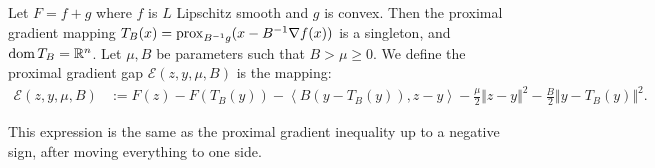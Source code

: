 \documentclass[12pt]{article}
\begin{document}
    \begin{definition}\label{def:pg-gap}
        Let $F = f + g$ where $f$ is $L$ Lipschitz smooth and $g$ is convex. 
        Then the proximal gradient mapping $T_B(x) = \operatorname{prox}_{B^{-1}g}(x -  B^{-1}\nabla f(x))$ is a singleton, and $\operatorname{dom} T_B = \mathbb R^n$. 
        Let $\mu, B$ be parameters such that $B > \mu \ge 0$. 
        We define the proximal gradient gap $\mathcal E(z, y, \mu, B)$ is the mapping: 
        \begin{align*}
            \mathcal E(z, y, \mu, B) &:= 
            F(z) - F(T_B(y)) 
            - \left\langle B(y - T_B(y)), z - y\right\rangle
            - \frac{\mu}{2}\Vert z - y\Vert^2
            - \frac{B}{2}\Vert y - T_B(y)\Vert^2. 
        \end{align*}
    \end{definition}
    \begin{remark}
        This expression is the same as the proximal gradient inequality up to a negative sign, after moving everything to one side. 
    \end{remark}
    
\end{document}
